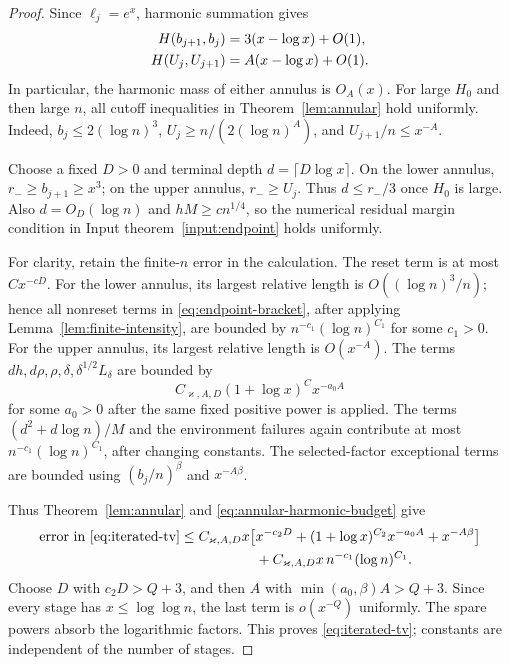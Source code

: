 \documentclass[11pt]{article}
\numberwithin{equation}{section}
\theoremstyle{definition}
\theoremstyle{remark}
\begin{document}
\begin{proof}
Since $\ell_j=e^x$, harmonic summation gives
\begin{align}
 H(b_{j+1},b_j)&=3(x-\log x)+O(1),\notag\\
 H(U_j,U_{j+1})&=A(x-\log x)+O(1).
 \label{eq:annular-harmonic-budget}
\end{align}
In particular, the harmonic mass of either annulus is $O_A(x)$.
For large $H_0$ and then large $n$, all cutoff inequalities in
Theorem~\ref{lem:annular} hold uniformly.  Indeed,
$b_j\le2(\log n)^3$, $U_j\ge n/(2(\log n)^A)$, and
$U_{j+1}/n\le x^{-A}$.

Choose a fixed $D>0$ and terminal depth $d=\lceil D\log x\rceil$.
On the lower annulus, $r_-\ge b_{j+1}\ge x^3$; on the upper annulus,
$r_-\ge U_j$.  Thus $d\le r_-/3$ once $H_0$ is large.
Also $d=O_D(\log n)$ and $hM\ge c n^{1/4}$, so the numerical residual
margin condition in Input theorem~\ref{input:endpoint} holds uniformly.

For clarity, retain the finite-$n$ error in the calculation.  The reset
term is at most $Cx^{-cD}$.  For the lower annulus, its largest relative
length is $O((\log n)^3/n)$; hence all nonreset terms in
\eqref{eq:endpoint-bracket}, after applying
Lemma~\ref{lem:finite-intensity}, are bounded by
$n^{-c_1}(\log n)^{C_1}$ for some $c_1>0$.
For the upper annulus, its largest relative length is $O(x^{-A})$.
The terms $dh,d\rho,\rho,\delta,\delta^{1/2}L_\delta$ are bounded by
\[
 C_{\varkappa,A,D}(1+\log x)^C x^{-a_0 A}
\]
for some $a_0>0$ after the same fixed positive power is applied.
The terms $(d^2+d\log n)/M$ and the environment failures again contribute
at most $n^{-c_1}(\log n)^{C_1}$, after changing constants.
The selected-factor exceptional terms are bounded using
$(b_j/n)^\beta$ and $x^{-A\beta}$.

Thus Theorem~\ref{lem:annular} and \eqref{eq:annular-harmonic-budget} give
\begin{equation}\label{eq:explicit-peel-budget}
\begin{split}
 \text{error in \eqref{eq:iterated-tv}}
 \le C_{\varkappa,A,D}x\bigl[&x^{-c_2D}+(1+\log x)^{C_2}x^{-a_0A}
       +x^{-A\beta}\bigr]\\
 &+C_{\varkappa,A,D}x\,n^{-c_1}(\log n)^{C_1}.
\end{split}
\end{equation}
Choose $D$ with $c_2D>Q+3$, and then $A$ with
$\min(a_0,\beta)A>Q+3$.  Since every stage has
$x\le\log\log n$, the last term is $o(x^{-Q})$ uniformly.
The spare powers absorb the logarithmic factors.  This proves
\eqref{eq:iterated-tv}; constants are independent of the number of stages.


\end{proof}
\end{document}
